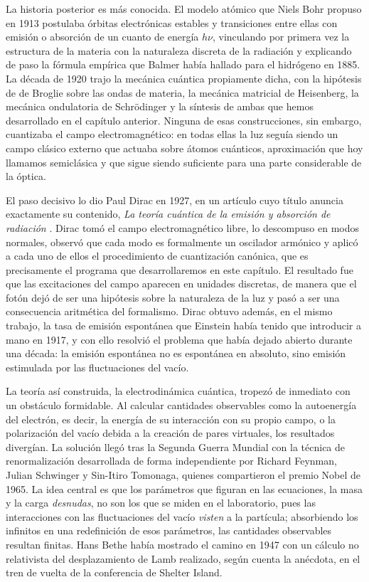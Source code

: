     La historia posterior es más conocida. El modelo atómico que Niels Bohr propuso en 1913 postulaba órbitas electrónicas estables y transiciones entre ellas con emisión o absorción de un cuanto de energía $h\nu$, vinculando por primera vez la estructura de la materia con la naturaleza discreta de la radiación y explicando de paso la fórmula empírica que Balmer había hallado para el hidrógeno en 1885. La década de 1920 trajo la mecánica cuántica propiamente dicha, con la hipótesis de de Broglie sobre las ondas de materia, la mecánica matricial de Heisenberg, la mecánica ondulatoria de Schrödinger y la síntesis de ambas que hemos desarrollado en el capítulo anterior. Ninguna de esas construcciones, sin embargo, cuantizaba el campo electromagnético: en todas ellas la luz seguía siendo un campo clásico externo que actuaba sobre átomos cuánticos, aproximación que hoy llamamos semiclásica y que sigue siendo suficiente para una parte considerable de la óptica.

    El paso decisivo lo dio Paul Dirac en 1927, en un artículo cuyo título anuncia exactamente su contenido, \textit{La teoría cuántica de la emisión y absorción de radiación} \citep{dirac1927quantum}. Dirac tomó el campo electromagnético libre, lo descompuso en modos normales, observó que cada modo es formalmente un oscilador armónico y aplicó a cada uno de ellos el procedimiento de cuantización canónica, que es precisamente el programa que desarrollaremos en este capítulo. El resultado fue que las excitaciones del campo aparecen en unidades discretas, de manera que el fotón dejó de ser una hipótesis sobre la naturaleza de la luz y pasó a ser una consecuencia aritmética del formalismo. Dirac obtuvo además, en el mismo trabajo, la tasa de emisión espontánea que Einstein había tenido que introducir a mano en 1917, y con ello resolvió el problema que había dejado abierto durante una década: la emisión espontánea no es espontánea en absoluto, sino emisión estimulada por las fluctuaciones del vacío.

    La teoría así construida, la electrodinámica cuántica, tropezó de inmediato con un obstáculo formidable. Al calcular cantidades observables como la autoenergía del electrón, es decir, la energía de su interacción con su propio campo, o la polarización del vacío debida a la creación de pares virtuales, los resultados divergían. La solución llegó tras la Segunda Guerra Mundial con la técnica de renormalización desarrollada de forma independiente por Richard Feynman, Julian Schwinger y Sin-Itiro Tomonaga, quienes compartieron el premio Nobel de 1965. La idea central es que los parámetros que figuran en las ecuaciones, la masa y la carga \textit{desnudas}, no son los que se miden en el laboratorio, pues las interacciones con las fluctuaciones del vacío \textit{visten} a la partícula; absorbiendo los infinitos en una redefinición de esos parámetros, las cantidades observables resultan finitas. Hans Bethe había mostrado el camino en 1947 con un cálculo no relativista del desplazamiento de Lamb realizado, según cuenta la anécdota, en el tren de vuelta de la conferencia de Shelter Island.


